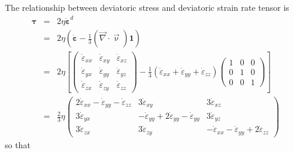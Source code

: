 The relationship between deviatoric stress and deviatoric strain rate tensor is 
\begin{eqnarray}
\bm \tau 
&=& 2 \eta \dot{\bm \varepsilon}^d \\
&=& 2 \eta \left( \dot{\bm \varepsilon} -\frac{1}{3}(\vec\nabla\cdot\vec \upnu) {\bm 1} \right) \\
&=& 2 \eta
\left[ 
\left(
\begin{array}{ccc}
\dot\varepsilon_{xx} & \dot\varepsilon_{xy} & \dot\varepsilon_{xz} \\ 
\dot\varepsilon_{yx} & \dot\varepsilon_{yy} & \dot\varepsilon_{yz} \\ 
\dot\varepsilon_{zx} & \dot\varepsilon_{zy} & \dot\varepsilon_{zz} 
\end{array}
\right)
-
\frac{1}{3}
(\dot\varepsilon_{xx} + \dot\varepsilon_{yy} +  \dot\varepsilon_{zz})
\left(
\begin{array}{ccc}
1 &0 &0 \\
0 &1 &0\\ 
0 &0 &1 
\end{array}
\right)
\right] \\
&=& \frac{2}{3} \eta
\left(
\begin{array}{ccc}
2\dot\varepsilon_{xx} -\dot\varepsilon_{yy} -\dot\varepsilon_{zz} & 
3\dot\varepsilon_{xy} &
3\dot\varepsilon_{xz} \\ 
3\dot\varepsilon_{yx} & 
-\dot\varepsilon_{yy} +2\dot\varepsilon_{yy} -\dot\varepsilon_{yy} & 
3\dot\varepsilon_{yz} \\ 
3\dot\varepsilon_{zx} & 
3\dot\varepsilon_{zy} & 
-\dot\varepsilon_{xx} -\dot\varepsilon_{yy} + 2\dot\varepsilon_{zz}  
\end{array}
\right)
\end{eqnarray}
so that 
